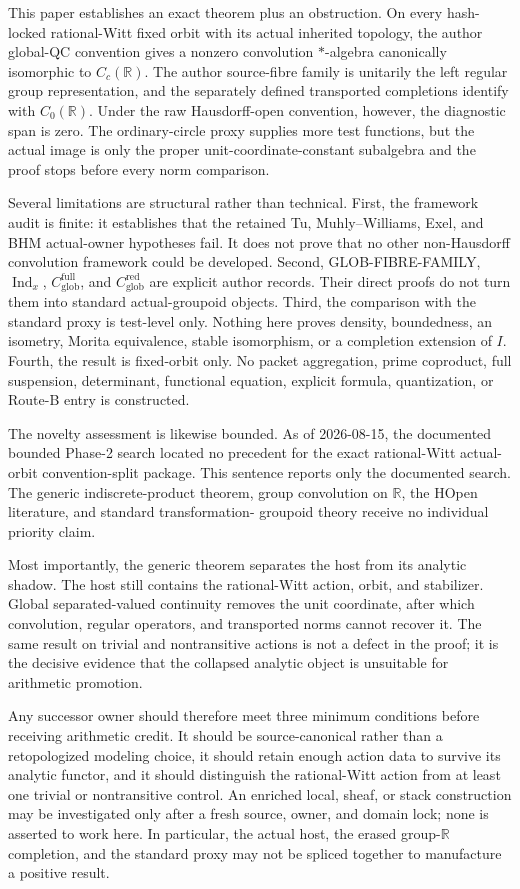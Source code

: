 \documentclass[11pt]{article}
\theoremstyle{definition}
\newcommand{\R}{\mathbb R}
\newcommand{\Cfull}{C_{\mathrm{glob}}^{\mathrm{full}}}
\newcommand{\Cred}{C_{\mathrm{glob}}^{\mathrm{red}}}
\newcommand{\Ind}{\operatorname{Ind}}
\begin{document}
This paper establishes an exact theorem plus an obstruction.  On every
hash-locked rational-Witt fixed orbit with its actual inherited topology,
the author global-QC convention gives a nonzero convolution $*$-algebra
canonically isomorphic to $C_c(\R)$.  The author source-fibre family is
unitarily the left regular group representation, and the separately defined
transported completions identify with $C_0(\R)$.  Under the raw
Hausdorff-open convention, however, the diagnostic span is zero.  The
ordinary-circle proxy supplies more test functions, but the actual image is
only the proper unit-coordinate-constant subalgebra and the proof stops
before every norm comparison.

Several limitations are structural rather than technical.  First, the
framework audit is finite: it establishes that the retained Tu,
Muhly--Williams, Exel, and BHM actual-owner hypotheses fail.  It does not
prove that no other non-Hausdorff convolution framework could be developed.
Second, GLOB-FIBRE-FAMILY, $\Ind_x$, $\Cfull$, and $\Cred$ are explicit
author records.  Their direct proofs do not turn them into standard
actual-groupoid objects.  Third, the comparison with the standard proxy is
test-level only.  Nothing here proves density, boundedness, an isometry,
Morita equivalence, stable isomorphism, or a completion extension of $I$.
Fourth, the result is fixed-orbit only.  No packet aggregation, prime
coproduct, full suspension, determinant, functional equation, explicit
formula, quantization, or Route-B entry is constructed.

The novelty assessment is likewise bounded.  As of 2026-08-15, the
documented bounded Phase-2 search located no precedent for the exact
rational-Witt actual-orbit convention-split package.  This sentence reports
only the documented search.  The generic indiscrete-product theorem, group
convolution on $\R$, the HOpen literature, and standard transformation-
groupoid theory receive no individual priority claim.

Most importantly, the generic theorem separates the host from its analytic
shadow.  The host still contains the rational-Witt action, orbit, and
stabilizer.  Global separated-valued continuity removes the unit coordinate,
after which convolution, regular operators, and transported norms cannot
recover it.  The same result on trivial and nontransitive actions is not a
defect in the proof; it is the decisive evidence that the collapsed analytic
object is unsuitable for arithmetic promotion.

Any successor owner should therefore meet three minimum conditions before
receiving arithmetic credit.  It should be source-canonical rather than a
retopologized modeling choice, it should retain enough action data to survive
its analytic functor, and it should distinguish the rational-Witt action from
at least one trivial or nontransitive control.  An enriched local, sheaf, or
stack construction may be investigated only after a fresh source, owner, and
domain lock; none is asserted to work here.  In particular, the actual host,
the erased group-$\R$ completion, and the standard proxy may not be spliced
together to manufacture a positive result.
\end{document}
